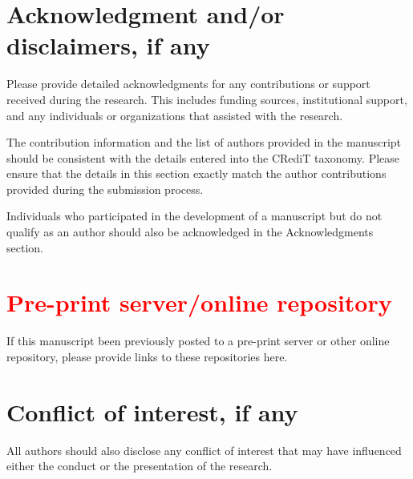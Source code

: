 \documentclass{elektr}
\begin{document}
\section*{Acknowledgment and/or disclaimers, if any}
Please provide detailed acknowledgments for any contributions or support received during the research. This includes funding sources, institutional support, and any individuals or organizations that assisted with the research.

The contribution information and the list of authors provided in the manuscript should be consistent with the details entered into the CRediT taxonomy. Please ensure that the details in this section exactly match the author contributions provided during the submission process.

Individuals who participated in the development of a manuscript but do not qualify as an author should also be acknowledged in the Acknowledgments section.

\section*{\textcolor{red}{Pre-print server/online repository}}
If this manuscript been previously posted to a pre-print server or other online repository, please provide links to these repositories here.

\section*{Conflict of interest, if any}
All authors should also disclose any conflict of interest that may have influenced either the conduct or the presentation of the research.



\end{document}

